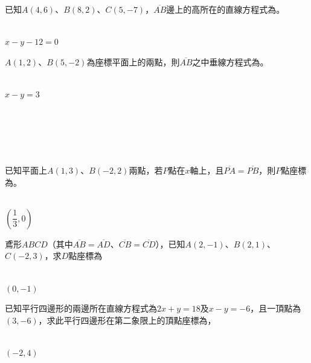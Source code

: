 \documentclass
[answers]
{exam}
\newcommand\ul[1]{\uline{\hspace*{#1}}}
\theoremstyle{definition}
\begin{document}
\begin{questions}
\question

已知$A\left( 4,6\right)$、$B\left( 8,2\right)$、$C\left( 5,-7\right)$，$\overline{AB}$邊上的高所在的直線方程式為\ul{50pt}。
\\ 
\begin{solution}~\\
	$x-y-12=0$
\end{solution}

\question

$A\left( 1,2\right)$、$B\left( 5,-2\right)$為座標平面上的兩點，則$\overline{AB}$之中垂線方程式為\ul{50pt}。
\\ 
\begin{solution}~\\
	$x-y=3$
\end{solution}

$ $\\$ $\\$ $\\$ $\\
\question

已知平面上$A\left( 1,3\right)$、$B\left( -2,2\right)$兩點，若$P$點在$x$軸上，且$\overline{PA}=\overline{PB}$，則$P$點座標為\ul{50pt}。
\\ 
\begin{solution}~\\
	$\left( \dfrac{1}{3} ,0\right)$
\end{solution}

\question

鳶形$ABCD$（其中$\overline{AB}=\overline{AD}$、$\overline{CB}=\overline{CD}$），已知$A\left( 2,-1\right)$、$B\left( 2,1\right)$、$C\left( -2,3\right)$，求$D$點座標為\ul{50pt}
\\ 
\begin{solution}~\\
	$\left( 0,-1 \right)$
\end{solution}

\question

已知平行四邊形的兩邊所在直線方程式為$2x+y=18$及$x-y=-6$，且一頂點為$\left( 3,-6\right)$，求此平行四邊形在第二象限上的頂點座標為\ul{50pt}，
\\ 
\begin{solution}~\\
	$\left( -2,4 \right)$
\end{solution}
$ $\\$ $\\
\question


\end{questions}
\end{document}
